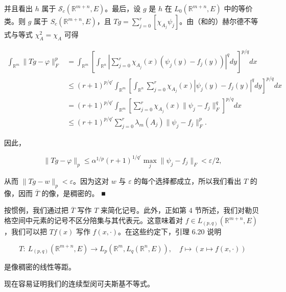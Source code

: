 \begin{lemma}
\begin{subitems}
并且看出 $ h $ 属于 $ \mathcal{S}_{c}(\mathbb{R}^{m+n},E) $。最后，设 $ g $ 是 $ h $ 在 $ L_{0}(\mathbb{R}^{m+n},E) $ 中的等价类。则 $ g $ 属于 $ S_{c}(\mathbb{R}^{m+n},E) $，且 $ Tg = \sum_{j=0}^{r}[\chi_{A_{j}}\psi_{j}] $。由（和的）赫尔德不等式与等式 $ \chi_{A}^{2} = \chi_{A} $ 可得

\begin{equation*}
\begin{aligned}
\int_{\mathbb{R}^{m}}\|Tg-\varphi\|^{p}_{F} &= \int_{\mathbb{R}^{m}}\left[\int_{\mathbb{R}^{n}}\left|\sum_{j=0}^{r}\chi_{A_{j}}(x)(\psi_{j}(y)-f_{j}(y))\right|^{q}dy\right]^{p/q}dx \\ &\le (r+1)^{p/q'}\int_{\mathbb{R}^{m}}\left[\int_{\mathbb{R}^{n}}\sum_{j=0}^{r}\chi_{A_{j}}(x)|\psi_{j}(y)-f_{j}(y)|^{q}dy\right]^{p/q}dx \\ &= (r+1)^{p/q'}\int_{\mathbb{R}^{m}}\left[\sum_{j=0}^{r}\chi_{A_{j}}(x)\|\psi_{j}-f_{j}\|^{q}_{F}\right]^{p/q}dx \\ &\le (r+1)^{p/q'}\sum_{j=0}^{r}\lambda_{m}(A_{j})\|\psi_{j}-f_{j}\|^{p}_{F} .
\end{aligned}
\end{equation*}

因此，

\[
\|Tg-\varphi\|_{p} \le \alpha^{1/p}(r+1)^{1/q'}\max_{j}\|\psi_{j}-f_{j}\|_{F} < \varepsilon/2 ,
\]

从而 $ \|Tg-w\|_{p} < \varepsilon $。因为这对 $ w $ 与 $ \varepsilon $ 的每个选择都成立，所以我们看出 $ T $ 的像，因而 $ \overline{T} $ 的像，是稠密的。 \nobreak\hspace{0.35em}■

\end{subitems}

\end{lemma}

按惯例，我们通过把 $ \overline{T} $ 写作 $ T $ 来简化记号。此外，正如第 4 节所述，我们对勒贝格空间中元素的记号不区分陪集与其代表元。这意味着对 $ f \in L_{(p,q)}(\mathbb{R}^{m+n},E) $，我们可以把 $ Tf(x) $ 写作 $ f(x,\cdot) $。在这些约定下，引理 6.20 说明

\begin{equation}
T:\ L_{(p,q)}(\mathbb{R}^{m+n},E) \to L_{p}\left(\mathbb{R}^{m},L_{q}(\mathbb{R}^{n},E)\right) ,\quad f \mapsto (x \mapsto f(x,\cdot))\tag{6.22}
\end{equation}

是像稠密的线性等距。

现在容易证明我们的连续型闵可夫斯基不等式。

